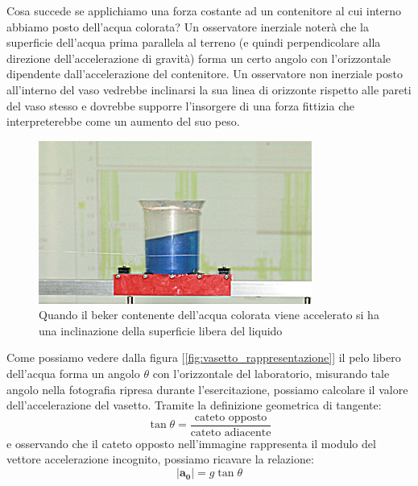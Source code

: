 \documentclass[a4paper,10pt,oneside]{article}
\begin{document}
Cosa succede se applichiamo una forza costante ad un contenitore al cui interno abbiamo posto dell'acqua colorata? Un osservatore inerziale noterà che la superficie dell'acqua prima parallela al terreno (e quindi perpendicolare alla direzione dell'accelerazione di gravità) forma un certo angolo con l'orizzontale dipendente dall'accelerazione del contenitore. Un osservatore non inerziale posto all'interno del vaso vedrebbe inclinarsi la sua linea di orizzonte rispetto alle pareti del vaso stesso e dovrebbe supporre l'insorgere di una forza fittizia che interpreterebbe come un aumento del suo peso. 
\begin{figure}[H]
 \centering
 \includegraphics[width=0.8\textwidth]{../immagini/vasetto.jpg}
 \caption{Quando il beker contenente dell'acqua colorata viene accelerato si ha una inclinazione della superficie libera del liquido}
 \label{fig:vasetto_accelerato}
\end{figure}
Come possiamo vedere dalla figura [\ref{fig:vasetto_rappresentazione}] il pelo libero dell'acqua forma un angolo $\theta$ con l'orizzontale del laboratorio, misurando tale angolo nella fotografia ripresa durante l'esercitazione, possiamo calcolare il valore dell'accelerazione  del vasetto. Tramite la definizione geometrica di tangente:
\begin{equation}
 \tan\theta=\frac{\textrm{cateto\ opposto}}{\textrm{cateto\ adiacente}}
\end{equation}
e osservando che il cateto opposto nell'immagine rappresenta il modulo del vettore accelerazione incognito, possiamo ricavare la relazione:
\begin{equation}
|\mathbf{a_0}|=g\tan\theta
\end{equation}
\end{document}
